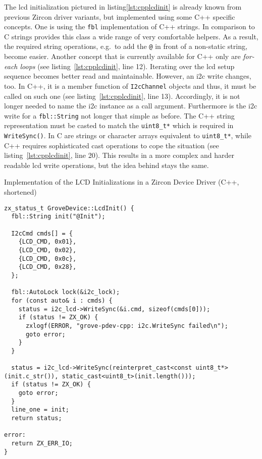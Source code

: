 The \ac{lcd} initialization pictured in listing\ref{lst:cpplcdinit} is already known from previous Zircon driver variants, but implemented using some C++ specific concepts.
One is using the \texttt{fbl} implementation of C++ strings.
In comparison to C strings provides this class a wide range of very comfortable helpers.
As a result, the required string operations, e.g.\ to add the \texttt{@} in front of a non-static string, become easier.
Another concept that is currently available for C++ only are \textit{for-each loops} (see listing~\ref{lst:cpplcdinit}, line 12).
Iterating over the \ac{lcd} setup sequence becomes better read and maintainable.
However, an \ac{i2c} write changes, too.
In C++, it is a member function of \texttt{I2cChannel} objects and thus, it must be called on such one (see listing~\ref{lst:cpplcdinit}, line 13).
Accordingly, it is not longer needed to name the \ac{i2c} instance as a call argument.
Furthermore is the \ac{i2c} write for a \texttt{fbl::String} not longer that simple as before.
The C++ string representation must be casted to match the \texttt{uint8_t*} which is required in \texttt{WriteSync()}.
In C are strings or character arrays equivalent to \texttt{uint8_t*}, while C++ requires sophisticated cast operations to cope the situation (see listing~\ref{lst:cpplcdinit}, line 20).
This results in a more complex and harder readable \ac{lcd} write operations, but the idea behind stays the same.

\begin{listing} [H]
    \caption{Implementation of the LCD Initializations in a Zircon Device Driver (C++, shortened)}
\label{lst:cpplcdinit}
\begin{verbatim}
zx_status_t GroveDevice::LcdInit() {
  fbl::String init("@Init");

  I2cCmd cmds[] = {
    {LCD_CMD, 0x01},
    {LCD_CMD, 0x02},
    {LCD_CMD, 0x0c},
    {LCD_CMD, 0x28},
  };

  fbl::AutoLock lock(&i2c_lock);
  for (const auto& i : cmds) {
    status = i2c_lcd->WriteSync(&i.cmd, sizeof(cmds[0]));
    if (status != ZX_OK) {
      zxlogf(ERROR, "grove-pdev-cpp: i2c.WriteSync failed\n");
      goto error;
    }
  }

  status = i2c_lcd->WriteSync(reinterpret_cast<const uint8_t*>(init.c_str()), static_cast<uint8_t>(init.length()));
  if (status != ZX_OK) {
    goto error;
  }
  line_one = init;
  return status;

error:
  return ZX_ERR_IO;
}
\end{verbatim}
\end{listing}

